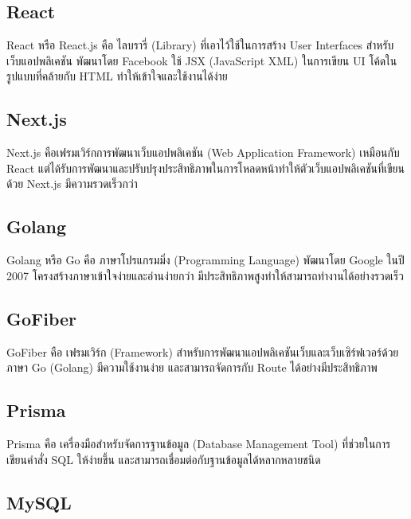 
\subsection{React}

React หรือ React.js คือ ไลบรารี่ (Library) ที่เอาไว้ใช้ในการสร้าง User Interfaces สำหรับเว็บแอปพลิเคชัน พัฒนาโดย Facebook ใช้ JSX (JavaScript XML) ในการเขียน UI โค้ดในรูปแบบที่คล้ายกับ HTML ทำให้เข้าใจและใช้งานได้ง่าย \cite{ReadyToReactWithJSX}


\subsection{Next.js}

Next.js คือเฟรมเวิร์กการพัฒนาเว็บแอปพลิเคชัน (Web Application Framework) เหมือนกับ React แต่ได้รับการพัฒนาและปรับปรุงประสิทธิภาพในการโหลดหน้าทำให้ตัวเว็บแอปพลิเคชันที่เขียนด้วย Next.js มีความรวดเร็วกว่า \cite{WhatIsNextjs}


\subsection{Golang}

Golang หรือ Go คือ ภาษาโปรแกรมมิ่ง (Programming Language) พัฒนาโดย Google ในปี 2007 โครงสร้างภาษาเข้าใจง่ายและอ่านง่ายกว่า มีประสิทธิภาพสูงทำให้สามารถทำงานได้อย่างรวดเร็ว \cite{WhatIsGolang}


\subsection{GoFiber}

GoFiber คือ เฟรมเวิร์ก (Framework) สำหรับการพัฒนาแอปพลิเคชันเว็บและเว็บเซิร์ฟเวอร์ด้วยภาษา Go (Golang) มีความใช้งานง่าย และสามารถจัดการกับ Route ได้อย่างมีประสิทธิภาพ \cite{FiberAndGormRunGolangApp}


\subsection{Prisma}

Prisma คือ เครื่องมือสำหรับจัดการฐานข้อมูล (Database Management Tool) ที่ช่วยในการเขียนคำสั่ง SQL ให้ง่ายขึ้น และสามารถเชื่อมต่อกับฐานข้อมูลได้หลากหลายชนิด \cite{WhatIsPrisma}


\subsection{MySQL}

